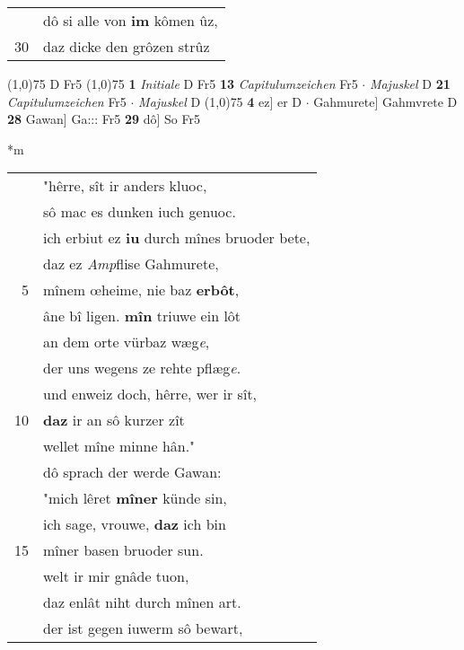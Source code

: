 \documentclass[8pt,a4paper,notitlepage]{article}
\begin{document}
\begin{table}[ht]
\begin{minipage}[t]{0.5\linewidth}
\begin{tabular}{rl}
 & dô si alle von \textbf{im} kômen ûz,\\ 
30 & daz dicke den grôzen strûz\\ 
\end{tabular}
\scriptsize
\line(1,0){75} \newline
D Fr5 \newline
\line(1,0){75} \newline
\textbf{1} \textit{Initiale} D Fr5  \textbf{13} \textit{Capitulumzeichen} Fr5   $\cdot$ \textit{Majuskel} D  \textbf{21} \textit{Capitulumzeichen} Fr5   $\cdot$ \textit{Majuskel} D  \newline
\line(1,0){75} \newline
\textbf{4} ez] er D  $\cdot$ Gahmurete] Gahmvrete D \textbf{28} Gawan] Ga::: Fr5 \textbf{29} dô] So Fr5 \newline
\end{minipage}
\hspace{0.5cm}
\begin{minipage}[t]{0.5\linewidth}
\small
\begin{center}*m
\end{center}
\begin{tabular}{rl}
 & "hêrre, sît ir anders kluoc,\\ 
 & sô mac es dunken iuch genuoc.\\ 
 & ich erbiut ez \textbf{iu} durch mînes bruoder bete,\\ 
 & daz ez \textit{Amp}flise Gahmurete,\\ 
5 & mînem œheime, nie baz \textbf{erbôt},\\ 
 & âne bî ligen. \textbf{mîn} triuwe ein lôt\\ 
 & an dem orte vürbaz wæg\textit{e},\\ 
 & der uns wegens ze rehte pflæg\textit{e}.\\ 
 & und enweiz doch, hêrre, wer ir sît,\\ 
10 & \textbf{daz} ir an sô kurzer zît\\ 
 & wellet mîne minne hân."\\ 
 & dô sprach der werde Gawan:\\ 
 & "mich lêret \textbf{mîner} künde sin,\\ 
 & ich sage, vrouwe, \textbf{daz} ich bin\\ 
15 & mîner basen bruoder sun.\\ 
 & welt ir mir gnâde tuon,\\ 
 & daz enlât niht durch mînen art.\\ 
 & der ist gegen iuwerm sô bewart,\\ 

\end{tabular}
\end{minipage}
\end{table}
\end{document}
